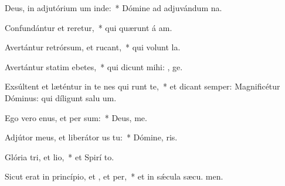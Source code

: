 \item Deus, in adjutórium um inde:~* Dómine ad adjuvándum  na.
\item Confundántur et reretur,~* qui quærunt á am.
\item Avertántur retrórsum, et rucant,~* qui volunt  la.
\item Avertántur statim ebetes,~* qui dicunt mihi: , ge.
\item Exsúltent et læténtur in te nes qui runt te,~* et dicant semper: Magnificétur Dóminus: qui díligunt salu um.
\item Ego vero enus, et per sum:~* Deus,  me.
\item Adjútor meus, et liberátor us  tu:~* Dómine,  ris.
\item Glória tri, et lio,~* et Spirí to.
\item Sicut erat in princípio, et , et per,~* et in sǽcula sæcu. men.
